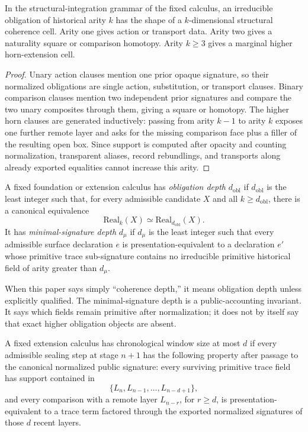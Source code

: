 \documentclass{lmcs}
\begin{document}
\begin{lem}
\label{lem:arity-cell}
In the structural-integration grammar of the fixed calculus, an irreducible obligation of
historical arity \(k\) has the shape of a \(k\)-dimensional structural coherence cell.  Arity
one gives action or transport data.  Arity two gives a naturality square or comparison
homotopy.  Arity \(k\geq 3\) gives a marginal higher horn-extension cell.
\end{lem}

\begin{proof}
Unary action clauses mention one prior opaque signature, so their normalized obligations are
single action, substitution, or transport clauses.  Binary comparison clauses mention two
independent prior signatures and compare the two unary composites through them, giving a
square or homotopy.  The higher horn clauses are generated inductively: passing from arity
\(k-1\) to arity \(k\) exposes one further remote layer and asks for the missing comparison
face plus a filler of the resulting open box.  Since support is computed after opacity and
counting normalization, transparent aliases, record rebundlings, and transports along already
exported equalities cannot increase this arity.
\end{proof}

\begin{defi}
\label{def:two-depths}
A fixed foundation or extension calculus has \emph{obligation depth} \(d_{\mathrm{obl}}\) if
\(d_{\mathrm{obl}}\) is the least integer such that, for every admissible candidate \(X\) and
all \(k\geq d_{\mathrm{obl}}\), there is a canonical equivalence
\[
  \mathrm{Real}_k(X) \simeq \mathrm{Real}_{d_{\mathrm{obl}}}(X).
\]
It has \emph{minimal-signature depth} \(d_\mu\) if \(d_\mu\) is the least integer such that
every admissible surface declaration \(e\) is presentation-equivalent to a declaration \(e'\)
whose primitive trace sub-signature contains no irreducible primitive historical field of
arity greater than \(d_\mu\).
\end{defi}

When this paper says simply ``coherence depth,'' it means obligation depth unless explicitly
qualified.  The minimal-signature depth is a public-accounting invariant.  It says which
fields remain primitive after normalization; it does not by itself say that exact higher
obligation objects are absent.

\begin{defi}
\label{def:chronological-window}
A fixed extension calculus has chronological window size at most \(d\) if every admissible
sealing step at stage \(n+1\) has the following property after passage to the canonical
normalized public signature: every surviving primitive trace field has support contained in
\[
  \{L_n,L_{n-1},\ldots,L_{n-d+1}\},
\]
and every comparison with a remote layer \(L_{n-r}\), for \(r\geq d\), is
presentation-equivalent to a trace term factored through the exported normalized signatures of
those \(d\) recent layers.
\end{defi}
\end{document}
